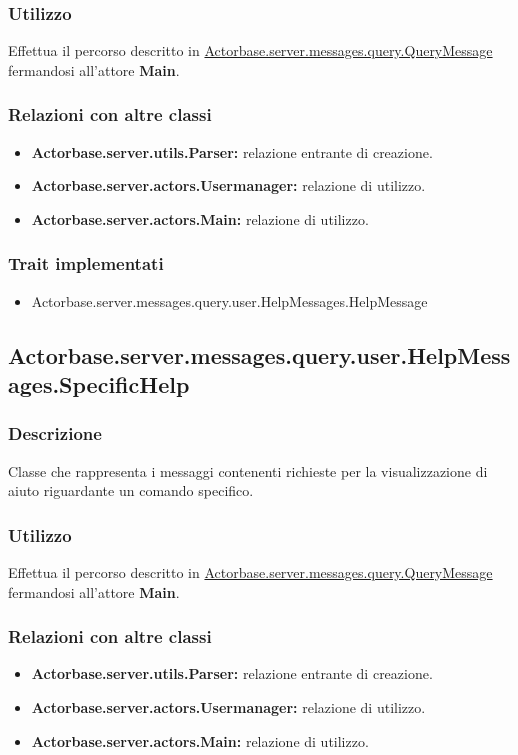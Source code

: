 \documentclass[a4paper]{article}
\begin{document}
			\subsubsection{Utilizzo}
				Effettua il percorso descritto in \hyperref[QueryMessage]{Actorbase.server.messages.query.QueryMessage} fermandosi all'attore \textbf{Main}.
				
			\subsubsection{Relazioni con altre classi}
				\begin{itemize}
					\item \textbf{Actorbase.server.utils.Parser:} relazione entrante di creazione.
					\item \textbf{Actorbase.server.actors.Usermanager:} relazione di utilizzo.
					\item \textbf{Actorbase.server.actors.Main:} relazione di utilizzo.
				\end{itemize}
			\subsubsection{Trait implementati}
				\begin{itemize}
					\item Actorbase.server.messages.query.user.HelpMessages.HelpMessage
				\end{itemize}

		\subsection{Actorbase.server.messages.query.user.HelpMessages.SpecificHelp}
			\subsubsection{Descrizione}
				Classe che rappresenta i messaggi contenenti richieste per la visualizzazione di aiuto riguardante un comando specifico.
				
			\subsubsection{Utilizzo}
				Effettua il percorso descritto in \hyperref[QueryMessage]{Actorbase.server.messages.query.QueryMessage} fermandosi all'attore \textbf{Main}.
				
			\subsubsection{Relazioni con altre classi}
				\begin{itemize}
					\item \textbf{Actorbase.server.utils.Parser:} relazione entrante di creazione.
					\item \textbf{Actorbase.server.actors.Usermanager:} relazione di utilizzo.
					\item \textbf{Actorbase.server.actors.Main:} relazione di utilizzo.
				\end{itemize}
\end{document}
